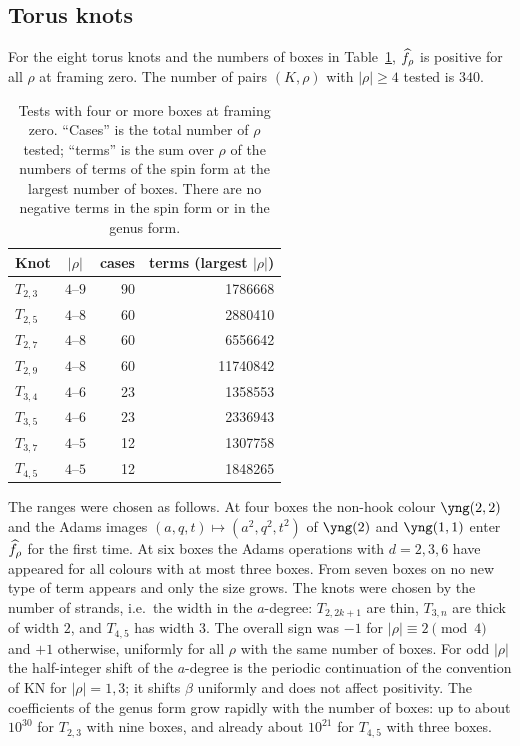 \subsection{Torus knots}
\begin{compresult}\label{cr:higher}
For the eight torus knots and the numbers of boxes in Table~\ref{tab:higher}, $\widehat{f}_\rho$ is positive for all $\rho$ at framing zero.
The number of pairs $(K,\rho)$ with $|\rho|\ge4$ tested is $340$.
\end{compresult}
\begin{table}[h]
\centering
\caption{Tests with four or more boxes at framing zero. ``Cases'' is the total number of $\rho$ tested; ``terms'' is the sum over $\rho$ of the numbers of terms of the spin form at the largest number of boxes.
There are no negative terms in the spin form or in the genus form.}\label{tab:higher}
\begin{tabular}{lcrr}
\toprule
Knot & $|\rho|$ & cases & terms (largest $|\rho|$) \\
\midrule
$T_{2,3}$ & $4$--$9$ & 90 & 1786668 \\
$T_{2,5}$ & $4$--$8$ & 60 & 2880410 \\
$T_{2,7}$ & $4$--$8$ & 60 & 6556642 \\
$T_{2,9}$ & $4$--$8$ & 60 & 11740842 \\
$T_{3,4}$ & $4$--$6$ & 23 & 1358553 \\
$T_{3,5}$ & $4$--$6$ & 23 & 2336943 \\
$T_{3,7}$ & $4$--$5$ & 12 & 1307758 \\
$T_{4,5}$ & $4$--$5$ & 12 & 1848265 \\
\bottomrule
\end{tabular}
\end{table}
The ranges were chosen as follows.
At four boxes the non-hook colour $\yng(2,2)$ and the Adams images $(a,q,t)\mapsto(a^2,q^2,t^2)$ of $\yng(2)$ and $\yng(1,1)$ enter $\widehat{f}_\rho$ for the first time.
At six boxes the Adams operations with $d=2,3,6$ have appeared for all colours with at most three boxes.
From seven boxes on no new type of term appears and only the size grows.
The knots were chosen by the number of strands, i.e.\ the width in the $a$-degree: $T_{2,2k+1}$ are thin, $T_{3,n}$ are thick of width $2$, and $T_{4,5}$ has width $3$.
The overall sign was $-1$ for $|\rho|\equiv2\pmod4$ and $+1$ otherwise, uniformly for all $\rho$ with the same number of boxes.
For odd $|\rho|$ the half-integer shift of the $a$-degree is the periodic continuation of the convention of KN for $|\rho|=1,3$; it shifts $\beta$ uniformly and does not affect positivity.
The coefficients of the genus form grow rapidly with the number of boxes: up to about $10^{30}$ for $T_{2,3}$ with nine boxes, and already about $10^{21}$ for $T_{4,5}$ with three boxes.

